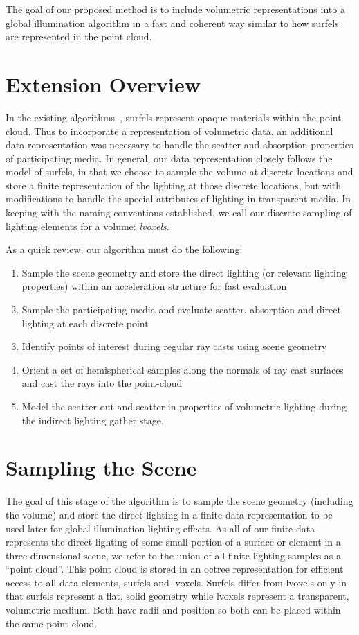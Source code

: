 \documentclass[12pt]{ucthesis}
\begin{document}
The goal of our proposed method is to include volumetric representations into a global illumination algorithm in a fast and coherent way similar to how surfels are represented in the point cloud.

\section{Extension Overview}

In the existing algorithms~\cite{christensen:2008}, surfels represent opaque materials within the point cloud.  Thus to incorporate a representation of volumetric data, an additional data representation was necessary to handle the scatter and absorption properties of participating media.  In general, our data representation closely follows the model of surfels, in that we choose to sample the volume at discrete locations and store a finite representation of the lighting at those discrete locations, but with modifications to handle the special attributes of lighting in transparent media.  In keeping with the naming conventions established, we call our discrete sampling of lighting elements for a volume: \emph{lvoxels}.  

As a quick review, our algorithm must do the following:
\begin{enumerate}
\item Sample the scene geometry and store the direct lighting (or relevant lighting properties) within an acceleration structure for fast evaluation
\item Sample the participating media and evaluate scatter, absorption and direct lighting at each discrete point
\item Identify points of interest during regular ray casts using scene geometry 
\item Orient a set of hemispherical samples along the normals of ray cast surfaces and cast the rays into the point-cloud
\item Model the scatter-out and scatter-in properties of volumetric lighting during the indirect lighting gather stage.
\end{enumerate}

\section{Sampling the Scene}
The goal of this stage of the algorithm is to sample the scene geometry (including the volume) and store the direct lighting in a finite data representation to be used later for global illumination lighting effects.  As all of our finite data represents the direct lighting of some small portion of a surface or element in a three-dimensional scene, we refer to the union of all finite lighting samples as a ``point cloud''.  This point cloud is stored in an octree representation for efficient access to all data elements, surfels and lvoxels.  Surfels differ from lvoxels only in that surfels represent a flat, solid geometry while lvoxels represent a transparent, volumetric medium.  Both have radii and position so both can be placed within the same point cloud.  
\end{document}
